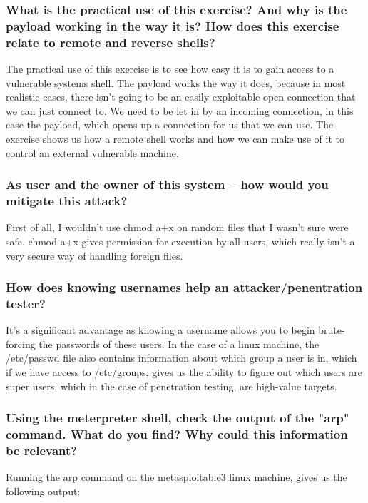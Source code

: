 \subsubsection{What is the practical use of this exercise? And why is the payload working in the way it is? How does this exercise relate to remote and reverse shells?}
The practical use of this exercise is to see how easy it is to gain access to a vulnerable systems shell. The payload works the way it does, because in most realistic cases, there isn't going to be an easily exploitable open connection that we can just connect to. We need to be let in by an incoming connection, in this case the payload, which opens up a connection for us that we can use. The exercise shows us how a remote shell works and how we can make use of it to control an external vulnerable machine.

\subsubsection{As user and the owner of this system -- how would you mitigate this attack?}
First of all, I wouldn't use chmod a+x on random files that I wasn't sure were safe. chmod a+x gives permission for execution by all users, which really isn't a very secure way of handling foreign files.

\subsubsection{How does knowing usernames help an attacker/penentration tester?}
It's a significant advantage as knowing a username allows you to begin brute-forcing the passwords of these users. In the case of a linux machine, the /etc/passwd file also contains information about which group a user is in, which if we have access to /etc/groups, gives us the ability to figure out which users are super users, which in the case of penetration testing, are high-value targets.

\subsubsection{Using the meterpreter shell, check the output of the "arp" command. What do you find? Why could this information be relevant?}
Running the arp command on the metasploitable3 linux machine, gives us the following output:


